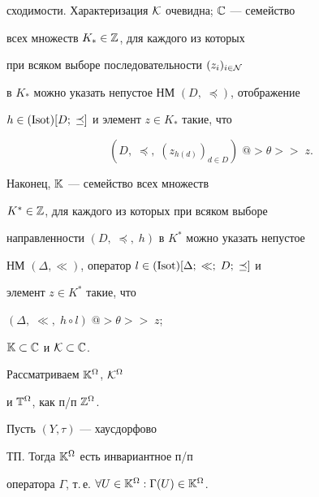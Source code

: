 сходимости. Характеризация ${\cal K}$ очевидна; ${\Bbb C}$ --- семейство


всех множеств ${K_*} \in {\Bbb Z}$, для каждого из которых


при всяком выборе последовательности ${(z_i)_{i \in {\cal N}}}$


в $K_*$ можно указать непустое НМ $(D,\;\preceq)$, отображение


$h \in (\operatorname{Isot})[D;\;\preceq]$ и элемент $z \in {K_*}$ такие, что


$$


(D,\;\preceq,\;(z_{h(d)})_{d \in D})\;@>\theta>> \;z.


$$


Наконец, ${\Bbb K}$ --- семейство всех множеств


${K^*} \in {\Bbb Z}$, для каждого из которых при всяком выборе


направленности $(D,\;\preceq,\;h)$ в $K^*$ можно указать непустое


НМ $(\Delta,\ll)$, оператор $l \in (\operatorname{Isot})[\Delta;\;\ll;\;D;\;\preceq]$ и


элемент $z \in {K^*}$ такие, что


$(\Delta,\;\ll,\;h \circ l)\;@>{\theta}>>\;z$;


${\Bbb K} \subset {\Bbb C}$ и ${\cal K} \subset {\Bbb C}$.


Рассматриваем ${{\Bbb K}^{\Omega}}$, ${{\cal K}^{\Omega}}$


и ${\Bbb T}^{\Omega}$, как п/п ${\Bbb Z}^{\Omega}$.





\begin{props}


Пусть $(Y,\tau)$ --- хаусдорфово


ТП. Тогда ${\Bbb K}^{\Omega}$ есть инвариантное п/п


оператора $\Gamma$, т.\,е. $\forall{U} \in {{\Bbb K}^{\Omega}}:


{{\Gamma}(U)} \in {{\Bbb K}^{\Omega}}$.


\end{props}





